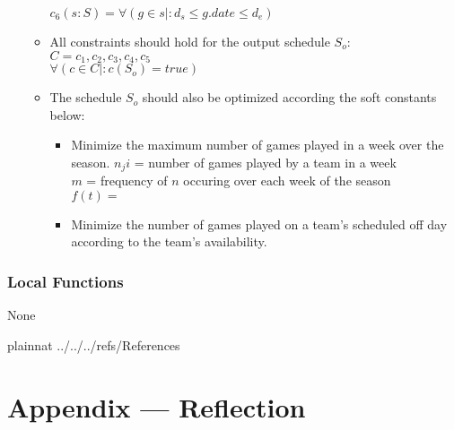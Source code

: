 \documentclass[12pt, titlepage]{article}
\begin{document}
\begin{itemize}
\begin{itemize}
  $c_6(s:S) = \forall (g \in s |: d_s \leq g.date \leq d_e)$
  \item All constraints should hold for the output schedule $S_o$:\\
  $C = {c_1, c_2, c_3, c_4, c_5}$\\
  $\forall(c \in C |: c(S_o) = true)$
  \item The schedule $S_o$ should also be optimized according the soft
  constants below:
  \begin{itemize}
    \item Minimize the maximum number of games played in a week over the
    season.
    $n_ji$ = number of games played by a team in a week\\
    $m$ = frequency of $n$ occuring over each week of the season\\
    $f(t) = $
    \item Minimize the number of games played on a team's scheduled off day
    according to the team's availability.
  \end{itemize}
\end{itemize}
\end{itemize}

\subsubsection{Local Functions}


None

\newpage

 {plainnat}
 {../../../refs/References}

\newpage



\newpage{}

\section*{Appendix --- Reflection}
\end{document}
